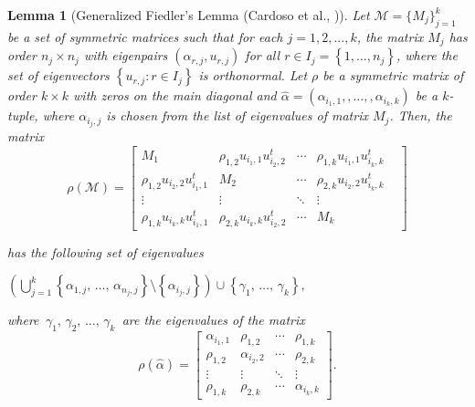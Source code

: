 \documentclass[11pt]{article}
\newtheorem{lemma}[theorem]{Lemma}
\theoremstyle{definition}
\begin{document}
\begin{lemma}[Generalized Fiedler's Lemma (Cardoso et al., \cite{Cardoso2013})]\label{Fiedler Generalizado}
Let $\mathcal{M}=\{M_j\}^k_{j=1}$ be a set of symmetric matrices such that for each $j=1,2,...,k$, the matrix $M_j$ has order $n_j\times n_j$ with eigenpairs $(\alpha_{r,j},u_{r,j})$ for all $r\in I_j=\left\lbrace 1, \ldots, n_j\right\rbrace$, where the set of eigenvectors $\left\lbrace u_{r,j}:r\in I_j \right\rbrace$ is orthonormal. Let $\rho$ be a symmetric matrix of order $k\times k$ with zeros on the main diagonal and $\hat{\alpha}=(\alpha_{i_1,1},, \ldots,, \alpha_{i_k,k})$ be a $k$-tuple, where $\alpha_{i_j,j}$ is chosen from the list of eigenvalues of matrix $M_j$. Then, the matrix
\[
\rho(\mathcal{M})=
\begin{bmatrix}
M_1&\rho_{1,2}u_{i_1,1}u_{i_2,2}^t&\cdots&\rho_{1,k}u_{i_1,1}u_{i_k,k}^t\\
\rho_{1,2}u_{i_2,2}u_{i_1,1}^t&M_2&\cdots&\rho_{2,k}u_{i_2,2}u_{i_k,k}^t&\\
\vdots&\vdots&\ddots&\vdots\\
\rho_{1,k}u_{i_k,k}u_{i_1,1}^t&\rho_{2,k}u_{i_k,k}u_{i_2,2}^t&\cdots&M_k
\end{bmatrix}
\]
	
has the following set of eigenvalues
\begin{center}
$\displaystyle{\left(\bigcup_{j=1}^{k}\left\lbrace \alpha_{1,j},\, \ldots,\, \alpha_{n_j,j} \right\rbrace\setminus\left\lbrace \alpha_{i_j,j} \right\rbrace\right)\cup\left\lbrace \gamma_1,\, \ldots ,\, \gamma_k \right\rbrace},$
\end{center}
where \,$\gamma_1,\, \gamma_2,\, \ldots ,\, \gamma_k$\, are the eigenvalues of the matrix
\[\rho(\widehat{\alpha})=
\begin{bmatrix}
\alpha_{i_1,1}&\rho_{1,2}&\cdots&\rho_{1,k}\\
\rho_{1,2}&\alpha_{i_2,2}&\cdots&\rho_{2,k}\\
\vdots&\vdots&\ddots&\vdots\\
\rho_{1,k}&\rho_{2,k}&\cdots&\alpha_{i_k,k}
\end{bmatrix}.
\]
\end{lemma}
\end{document}
